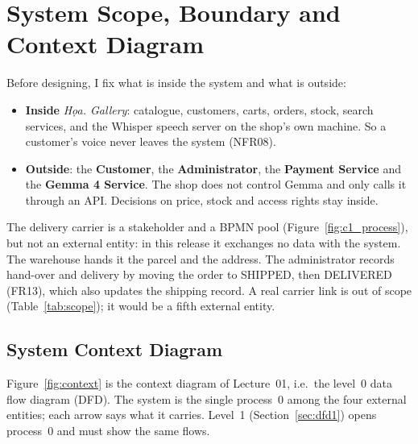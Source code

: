 
\section{System Scope, Boundary and Context Diagram}\label{sec:1.7}

Before designing, I fix what is inside the system and what is outside:
\begin{itemize}
\item \textbf{Inside} \emph{Họa. Gallery}: catalogue, customers, carts, orders, stock, search services, and the
      Whisper speech server on the shop's own machine. So a customer's voice never leaves the system (NFR08).
\item \textbf{Outside}: the \textbf{Customer}, the \textbf{Administrator}, the \textbf{Payment Service} and the
      \textbf{Gemma 4 Service}. The shop does not control Gemma and only calls it through an API. Decisions on price,
      stock and access rights stay inside.
\end{itemize}

The delivery carrier is a stakeholder and a BPMN pool (Figure~\ref{fig:c1_process}), but not an external entity: in
this release it exchanges no data with the system. The warehouse hands it the parcel and the address. The
administrator records hand-over and delivery by moving the order to SHIPPED, then DELIVERED (FR13), which also
updates the shipping record. A real carrier link is out of scope (Table~\ref{tab:scope}); it would be a fifth
external entity.

\subsection{System Context Diagram}\label{sec:1.7.1}

Figure~\ref{fig:context} is the context diagram of Lecture~01, i.e.\ the level~0 data flow diagram (DFD). The system
is the single process~0 among the four external entities; each arrow says what it carries. Level~1
(Section~\ref{sec:dfd1}) opens process~0 and must show the same flows.


